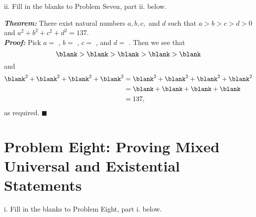 \documentclass{article}
\renewcommand{\(}{\left(}
\renewcommand{\)}{\right)}
\renewcommand\qedsymbol{$\blacksquare$}
\renewcommand{\emph}[1]{\textit{\textbf{#1}}}
\theoremstyle{plain}
\theoremstyle{plain}
\theoremstyle{definition}
\begin{document}
ii. Fill in the blanks to Problem Seven, part ii. below.
\begin{center}
\begin{boxedminipage}{0.9\textwidth}
\emph{Theorem:} There exist natural numbers $a, b, c,$ and $d$ such that $a > b > c > d > 0$ and $a^2 + b^2 + c^2 + d^2 = 137.$\\
\emph{Proof: } Pick $a = $ \blank, $b = $ \blank, $c = $ \blank, and $d = $ \blank. Then we see that
\begin{equation*} \blank > \blank > \blank > \blank > \blank \end{equation*}
and
\begin{equation*}
\begin{aligned}
\blank^2 + \blank^2 + \blank^2 + \blank^2
&= \blank^2 + \blank^2 + \blank^2 + \blank^2 \\
&= \blank + \blank + \blank + \blank \\ &= 137, \end{aligned} \end{equation*}
as required. \qedsymbol
\end{boxedminipage}
\end{center}

\newpage

\section*{Problem Eight: Proving Mixed Universal and Existential Statements}
i. Fill in the blanks to Problem Eight, part i. below.
\end{document}
